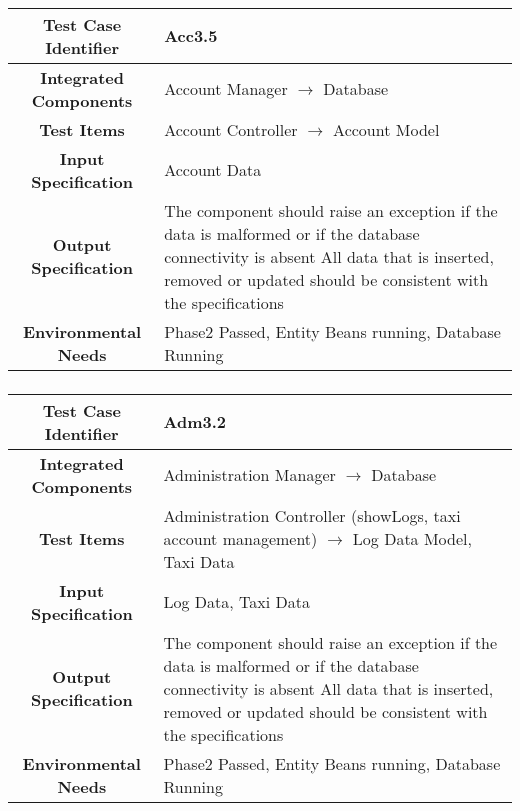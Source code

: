 \documentclass[11pt, a4paper,titlepage]{article}
\begin{document}
		\subsubsection{}
		\begin{tabularx}{\textwidth}{| c|X|}
			\hline \textbf{Test Case Identifier} & \label{Acc3.5}Acc3.5 \\
			\hline \textbf{Integrated Components} & Account Manager $\rightarrow $ Database \\
			\hline \textbf{Test Items} & Account Controller $\rightarrow $ Account Model \\
			\hline \textbf{Input Specification} & Account Data \\
			\hline \textbf{Output Specification} & The component should raise an exception if the data is malformed or if the database connectivity is absent \newline
			All data that is inserted, removed or updated should be consistent with the specifications\\
			\hline \textbf{Environmental Needs} & Phase2 Passed, Entity Beans running, Database Running \\
			\hline
		\end{tabularx}
		\newline
		\subsubsection{}
		\begin{tabularx}{\textwidth}{| c|X|}
			\hline \textbf{Test Case Identifier} & \label{Adm3.2}Adm3.2 \\
			\hline \textbf{Integrated Components} & Administration Manager $\rightarrow $ Database \\
			\hline \textbf{Test Items} & Administration Controller (showLogs, taxi account management) $\rightarrow $ Log Data Model, Taxi Data \\
			\hline \textbf{Input Specification} & Log Data, Taxi Data \\
			\hline \textbf{Output Specification} & The component should raise an exception if the data is malformed or if the database connectivity is absent \newline
			All data that is inserted, removed or updated should be consistent with the specifications\\
			\hline \textbf{Environmental Needs} & Phase2 Passed, Entity Beans running, Database Running \\
			\hline
		\end{tabularx}
		\newline
\end{document}
